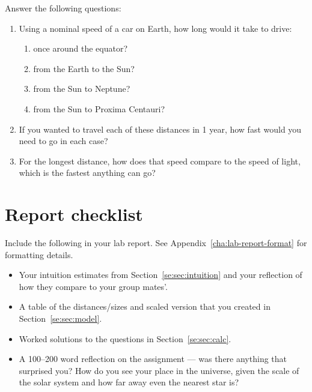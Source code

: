 Answer the following questions:
\begin{enumerate}
	\item Using a nominal speed of a car on Earth, how long would it take to drive:
	\begin{enumerate}
		\item once around the equator?
		\item from the Earth to the Sun?
		\item from the Sun to Neptune?
		\item from the Sun to Proxima Centauri?
	\end{enumerate}
	\item If you wanted to travel each of these distances in 1 year, how fast would you need to go in each case?
	\item For the longest distance, how does that speed compare to the speed of light, which is the fastest anything can go?
\end{enumerate}

\section{Report checklist}

Include the following in your lab report. See Appendix~\ref{cha:lab-report-format} for formatting details.

\begin{itemize}
	\item Your intuition estimates from Section~\ref{se:sec:intuition} and your reflection of how they compare to your group mates'.
	\item A table of the distances/sizes and scaled version that you created in Section~\ref{se:sec:model}.
	\item Worked solutions to the questions in Section~\ref{se:sec:calc}.
	\item A 100--200 word reflection on the assignment --- was there anything that surprised you? How do you see your place in the universe, given the scale of the solar system and how far away even the nearest star is?
\end{itemize}
